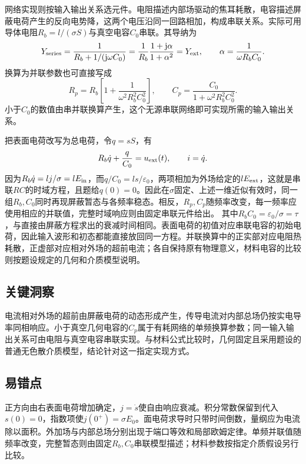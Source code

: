 \documentclass[UTF8,fontset=fandol,a4paper,11pt]{ctexart}
\begin{document}
网络实现则按输入输出关系选元件。电阻描述内部场驱动的焦耳耗散，电容描述屏蔽电荷产生的反向电势降，这两个电压沿同一回路相加，构成串联关系。实际可用导体电阻$R_b=l/(\sigma S)$与真空电容$C_0$串联。其导纳为
\[
Y_{\rm series}=\frac1{R_b+1/(\mathrm j\omega C_0)}
=\frac1{R_b}\frac{1+\mathrm j\alpha}{1+\alpha^2}
=Y_{\rm ext},
\qquad \alpha=\frac1{\omega R_bC_0}.
\]
换算为并联参数也可直接写成
\[
R_p=R_b\left[1+\frac1{\omega^2R_b^2C_0^2}\right],
\qquad
C_p=\frac{C_0}{1+\omega^2R_b^2C_0^2}.
\]
小于$C_0$的数值由串并联换算产生，这个无源串联网络即可实现所需的输入输出关系。

把表面电荷改写为总电荷，令$q=sS$，有
\[
R_b\dot q+\frac q{C_0}=u_{\rm ext}(t),\qquad i=\dot q.
\]
因为$R_b\dot q=l j/\sigma=lE_{\rm in}$，而$q/C_0=l s/\varepsilon_0$，两项相加为外场给定的$lE_{\rm ext}$，这就是串联$RC$的时域方程，且题给$q(0)=0$。因此在$\sigma$固定、上述一维近似有效时，同一组$R_b,C_0$同时再现屏蔽暂态与各频率稳态。相反，$R_p,C_p$随频率改变，每一频率应使用相应的并联值，完整时域响应则由固定串联元件给出。
其中$R_bC_0=\varepsilon_0/\sigma=\tau$，与直接由屏蔽方程求出的衰减时间相同。表面电荷的初值对应串联电容的初始电荷，因此输入波形和初态都能直接放回同一方程。并联换算中的正实部对应电阻热耗散，正虚部对应相对外场的超前电流；各自保持原有物理意义，材料电容的比较则按题设规定的几何和介质模型说明。





\subsection*{关键洞察}

电流相对外场的超前由屏蔽电荷的动态形成产生，传导电流对内部总场仍按实电导率同相响应。小于真空几何电容的$C_p$属于有耗网络的单频换算参数；同一输入输出关系可由电阻与真空电容串联实现。与材料公式比较时，几何固定且采用题设的普通无色散介质模型，结论针对这一指定实现方式。



\subsection*{易错点}

正方向由右表面电荷增加确定，$j=\dot s$使自由响应衰减。积分常数保留到代入$s(0)=0$，指数项使$j(0^+)=\sigma E_0$。面电荷求导时只带时间倒数，量纲应为电流除以面积。外加场与内部总场分别出现于端口等效和局部欧姆定律。单频并联值随频率改变，完整暂态则由固定$R_b,C_0$串联模型描述；材料参数按指定介质假设另行比较。
\end{document}
